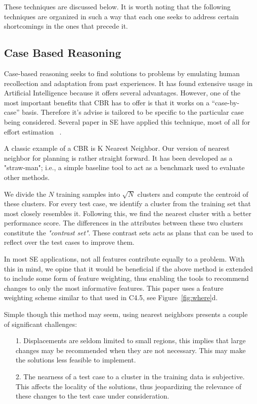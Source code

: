 \documentclass{sig-alternate}
\newcommand{\fig}[1]{Figure~\ref{fig:#1}}
\begin{document}
These techniques are discussed below. It is worth noting that the following techniques are organized in such a way that each one seeks to address certain shortcomings in the ones that precede it. 

\subsection{Case Based Reasoning}

Case-based reasoning seeks to find solutions to problems by emulating human recollection and adaptation from past experiences. It has found extensive usage in Artificial Intelligence because it offers several advantages. However, one of the most important benefits that CBR has to offer is that it works on a ``case-by-case'' basis. Therefore it's advise is tailored to be specific to the particular case being considered. Several paper in SE have applied this technique, most of all for effort estimation ~\cite{keung2008analogy, 6600685, walkerden1999empirical, shepperd1997estimating, kocaguneli2010use}. 

A classic example of a CBR is K Nearest Neighbor. Our version of nearest neighbor for planning is rather straight forward. It has been developed as a "straw-man"; i.e., a simple baseline tool to act as a benchmark used to evaluate other methods. 

We divide the $N$ training samples into $\sqrt{N}$ clusters and compute the centroid of these clusters. For every test case, we identify a cluster from the training set that most closely resembles it. Following this, we find the nearest cluster with a better performance score. The differences in the attributes between these two clusters constitute the \textit{"contrast set"}. These contrast sets acts as plans that can be used to reflect over the test cases to improve them.

In most SE applications, not all features contribute equally to a problem. With this in mind, we opine that it would be beneficial if the above method is extended to include some form of feature weighting, thus enabling the tools to recommend changes to only the most informative features. This paper uses a feature weighting scheme similar to that used in C4.5, see \fig{where}d.

Simple though this method may seem, using nearest neighbors presents a couple of significant challenges: 
\begin{itemize}
\item[1.] Displacements are seldom limited to small regions, this implies that large changes may be recommended when they are not necessary. This may make the solutions less feasible to implement. 
\item[2.] The nearness of a test case to a cluster in the training data is subjective. This affects the locality of the solutions, thus jeopardizing the relevance of these changes to the test case under consideration.
\end{itemize}
\end{document}
